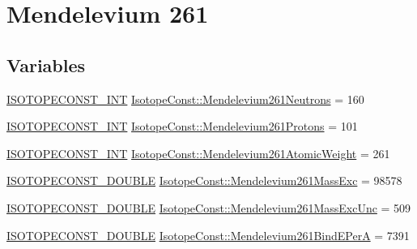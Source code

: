 \hypertarget{group___isotope_const-_mendelevium-_md261}{}\section{Mendelevium 261}
\label{group___isotope_const-_mendelevium-_md261}
\subsection*{Variables}
\begin{DoxyCompactItemize}
\item 
\mbox{\hyperlink{group___isotope_const-_macros_ga5f18360b3e99483a35c32d789e62621c}{I\+S\+O\+T\+O\+P\+E\+C\+O\+N\+S\+T\+\_\+\+I\+NT}} \mbox{\hyperlink{group___isotope_const-_mendelevium-_md261_ga37c0b01fcfd3bd4475b7fd6e52dd2b35}{Isotope\+Const\+::\+Mendelevium261\+Neutrons}} = 160
\item 
\mbox{\hyperlink{group___isotope_const-_macros_ga5f18360b3e99483a35c32d789e62621c}{I\+S\+O\+T\+O\+P\+E\+C\+O\+N\+S\+T\+\_\+\+I\+NT}} \mbox{\hyperlink{group___isotope_const-_mendelevium-_md261_gacb545baf97fc79ce0dea0418116997f8}{Isotope\+Const\+::\+Mendelevium261\+Protons}} = 101
\item 
\mbox{\hyperlink{group___isotope_const-_macros_ga5f18360b3e99483a35c32d789e62621c}{I\+S\+O\+T\+O\+P\+E\+C\+O\+N\+S\+T\+\_\+\+I\+NT}} \mbox{\hyperlink{group___isotope_const-_mendelevium-_md261_gaf86bbd4cf7fc04ed773f25f65ffe217b}{Isotope\+Const\+::\+Mendelevium261\+Atomic\+Weight}} = 261
\item 
\mbox{\hyperlink{group___isotope_const-_macros_ga8f45a7272ce02c0b4c65c44636ed719a}{I\+S\+O\+T\+O\+P\+E\+C\+O\+N\+S\+T\+\_\+\+D\+O\+U\+B\+LE}} \mbox{\hyperlink{group___isotope_const-_mendelevium-_md261_ga8e60edaa6be277cbade5ac67ab75b1ed}{Isotope\+Const\+::\+Mendelevium261\+Mass\+Exc}} = 98578
\item 
\mbox{\hyperlink{group___isotope_const-_macros_ga8f45a7272ce02c0b4c65c44636ed719a}{I\+S\+O\+T\+O\+P\+E\+C\+O\+N\+S\+T\+\_\+\+D\+O\+U\+B\+LE}} \mbox{\hyperlink{group___isotope_const-_mendelevium-_md261_ga5534ceccb4458aea1d197ea616193dbe}{Isotope\+Const\+::\+Mendelevium261\+Mass\+Exc\+Unc}} = 509
\item 
\mbox{\hyperlink{group___isotope_const-_macros_ga8f45a7272ce02c0b4c65c44636ed719a}{I\+S\+O\+T\+O\+P\+E\+C\+O\+N\+S\+T\+\_\+\+D\+O\+U\+B\+LE}} \mbox{\hyperlink{group___isotope_const-_mendelevium-_md261_ga143b7d7e010f2ec7c9f23aeddc0dbcd6}{Isotope\+Const\+::\+Mendelevium261\+Bind\+E\+PerA}} = 7391

\end{DoxyCompactItemize}
